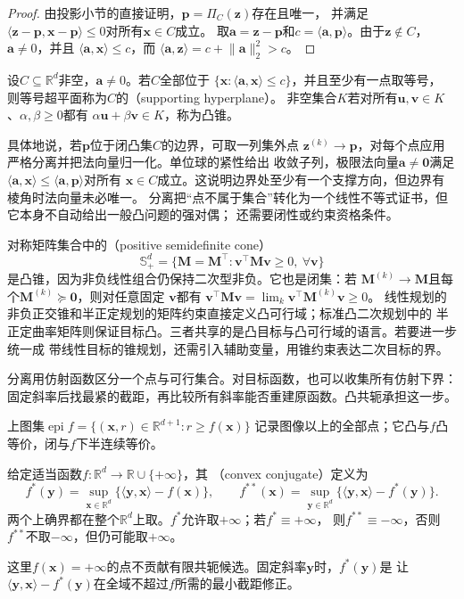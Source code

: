 \begin{proof}
由投影小节的直接证明，$\bm p=\Pi_C(\bm z)$存在且唯一，
并满足$\langle\bm z-\bm p,\bm x-\bm p\rangle\leq0$对所有$\bm x\in C$成立。
取$\bm a=\bm z-\bm p$和$c=\langle\bm a,\bm p\rangle$。由于$\bm z\notin C$，
$\bm a\neq0$，并且
$\langle\bm{a},\bm{x}\rangle\leq c$，而
$\langle\bm{a},\bm{z}\rangle=c+\lVert\bm{a}\rVert_2^2>c$。
\end{proof}

\begin{definition}[支撑超平面与凸锥]
\label{def:opt-supporting-hyperplane-cone}
设$C\subseteq\mathbb R^d$非空，$\bm a\neq0$。若$C$全部位于
$\{\bm x:\langle\bm a,\bm x\rangle\leq c\}$，并且至少有一点取等号，
则等号超平面称为$C$的（supporting hyperplane）。
非空集合$K$若对所有$\bm u,\bm v\in K$、$\alpha,\beta\geq0$都有
$\alpha\bm u+\beta\bm v\in K$，称为凸锥。
\end{definition}
具体地说，若$\bm{p}$位于闭凸集$C$的边界，可取一列集外点
$\bm{z}^{(k)}\to\bm{p}$，对每个点应用严格分离并把法向量归一化。单位球的紧性给出
收敛子列，极限法向量$\bm{a}\neq\bm{0}$满足
$\langle\bm{a},\bm{x}\rangle\leq\langle\bm{a},\bm{p}\rangle$对所有
$\bm{x}\in C$成立。这说明边界处至少有一个支撑方向，但边界有棱角时法向量未必唯一。
分离把“点不属于集合”转化为一个线性不等式证书，但它本身不自动给出一般凸问题的强对偶；
还需要闭性或约束资格条件。

对称矩阵集合中的（positive semidefinite cone）
\[
  \mathbb{S}_+^d=\{\bm{M}=\bm{M}^{\top}:
  \bm{v}^{\top}\bm{M}\bm{v}\geq0,\ \forall\bm{v}\}
\]
是凸锥，因为非负线性组合仍保持二次型非负。它也是闭集：若
$\bm{M}^{(k)}\to\bm{M}$且每个$\bm{M}^{(k)}\succeq\bm{0}$，则对任意固定
$\bm{v}$都有
$\bm{v}^{\top}\bm{M}\bm{v}
=\lim_k\bm{v}^{\top}\bm{M}^{(k)}\bm{v}\geq0$。
线性规划的非负正交锥和半正定规划的矩阵约束直接定义凸可行域；标准凸二次规划中的
半正定曲率矩阵则保证目标凸。三者共享的是凸目标与凸可行域的语言。若要进一步统一成
带线性目标的锥规划，还需引入辅助变量，用锥约束表达二次目标的界。

分离用仿射函数区分一个点与可行集合。对目标函数，也可以收集所有仿射下界：
固定斜率后找最紧的截距，再比较所有斜率能否重建原函数。凸共轭承担这一步。

上图集$\operatorname{epi}f=\{(\bm x,r)\in\mathbb R^{d+1}:r\geq f(\bm x)\}$
记录图像以上的全部点；它凸与$f$凸等价，闭与$f$下半连续等价。
\begin{definition}[凸共轭与双共轭]
\label{def:opt-conjugate}
给定适当函数$f:\mathbb R^d\to\mathbb R\cup\{+\infty\}$，其
（convex conjugate）定义为
\begin{equation}
 f^*(\bm y)=\sup_{\bm x\in\mathbb R^d}
            \{\langle\bm y,\bm x\rangle-f(\bm x)\},
 \qquad
 f^{**}(\bm x)=\sup_{\bm y\in\mathbb R^d}
            \{\langle\bm y,\bm x\rangle-f^*(\bm y)\}.
 \label{eq:opt-conjugate-biconjugate}
\end{equation}
两个上确界都在整个$\mathbb R^d$上取。$f^*$允许取$+\infty$；若$f^*\equiv+\infty$，
则$f^{**}\equiv-\infty$，否则$f^{**}$不取$-\infty$，但仍可能取$+\infty$。
\end{definition}
这里$f(\bm x)=+\infty$的点不贡献有限共轭候选。固定斜率$\bm y$时，$f^*(\bm y)$是
让$\langle\bm y,\bm x\rangle-f^*(\bm y)$在全域不超过$f$所需的最小截距修正。

